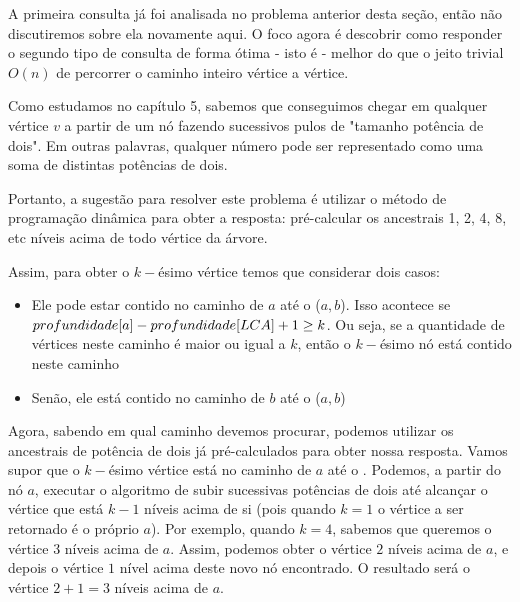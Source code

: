 A primeira consulta já foi analisada no problema anterior desta seção, então não discutiremos sobre ela novamente aqui. O foco agora é descobrir como responder o segundo tipo de consulta de forma ótima - isto é - melhor do que o jeito trivial $O(n)$ de percorrer o caminho inteiro vértice a vértice.

Como estudamos no capítulo 5, sabemos que conseguimos chegar em qualquer vértice $v$ a partir de um nó fazendo sucessivos pulos de "tamanho potência de dois". Em outras palavras, qualquer número pode ser representado como uma soma de distintas potências de dois.

Portanto, a sugestão para resolver este problema é utilizar o método de programação dinâmica para obter a resposta: pré-calcular os ancestrais 1, 2, 4, 8, etc níveis acima de todo vértice da árvore.

Assim, para obter o $k-$ésimo vértice temos que considerar dois casos:

\begin{itemize}
    \item Ele pode estar contido no caminho de $a$ até o \LCA($a, b$). Isso acontece se $profundidade[a] - profundidade[LCA] + 1 \geq k$. Ou seja, se a quantidade de vértices neste caminho é maior ou igual a $k$, então o $k-$ésimo nó está contido neste caminho
    \item Senão, ele está contido no caminho de $b$ até o \LCA($a, b$)
\end{itemize}

Agora, sabendo em qual caminho devemos procurar, podemos utilizar os ancestrais de potência de dois já pré-calculados para obter nossa resposta. Vamos supor que o $k-$ésimo vértice está no caminho de $a$ até o \LCA. Podemos, a partir do nó $a$, executar o algoritmo de subir sucessivas potências de dois até alcançar o vértice que está $k-1$ níveis acima de si (pois quando $k = 1$ o vértice a ser retornado é o próprio $a$). Por exemplo, quando $k = 4$, sabemos que queremos o vértice $3$ níveis acima de $a$. Assim, podemos obter o vértice $2$ níveis acima de $a$, e depois o vértice $1$ nível acima deste novo nó encontrado. O resultado será o vértice $2 + 1 = 3$ níveis acima de $a$.

\vspace{10cm}

